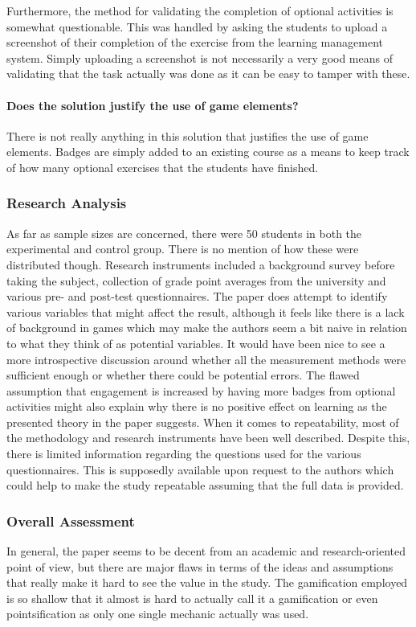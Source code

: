 Furthermore, the method for validating the completion of optional activities is somewhat questionable. This was handled by asking the students to upload a screenshot of their completion of the exercise from the learning management system. Simply uploading a screenshot is not necessarily a very good means of validating that the task actually was done as it can be easy to tamper with these. 

\paragraph{Does the solution justify the use of game elements?}
There is not really anything in this solution that justifies the use of game elements. Badges are simply added to an existing course as a means to keep track of how many optional exercises that the students have finished.  

\subsubsection{Research Analysis}
As far as sample sizes are concerned, there were 50 students in both the experimental and control group. There is no mention of how these were distributed though. Research instruments included a background survey before taking the subject, collection of grade point averages from the university and various pre- and post-test questionnaires. 
The paper does attempt to identify various variables that might affect the result, although it feels like there is a lack of background in games which may make the authors seem a bit naive in relation to what they think of as potential variables. It would have been nice to see a more introspective discussion around whether all the measurement methods were sufficient enough or whether there could be potential errors. The flawed assumption that engagement is increased by having more badges from optional activities might also explain why there is no positive effect on learning as the presented theory in the paper suggests. 
When it comes to repeatability, most of the methodology and research instruments have been well described. Despite this, there is limited information regarding the questions used for the various questionnaires. This is supposedly available upon request to the authors which could help to make the study repeatable assuming that the full data is provided. 

\subsubsection{Overall Assessment}
In general, the paper seems to be decent from an academic and research-oriented point of view, but there are major flaws in terms of the ideas and assumptions that really make it hard to see the value in the study. The gamification employed is so shallow that it almost is hard to actually call it a gamification or even pointsification as only one single mechanic actually was used. 